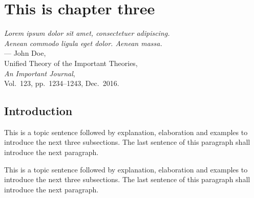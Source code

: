 

%
%
\chapter{This is chapter three}
\label{ch:name3}

\begin{flushright}
{\slshape Lorem ipsum dolor sit amet, consectetuer adipiscing.}\\
{\slshape Aenean commodo ligula eget dolor. Aenean massa.}\\
\medskip
--- John Doe,\\
Unified Theory of the Important Theories,\\
{\slshape An Important Journal},\\
Vol.~123, pp.~1234--1243, Dec.~2016.\\
\end{flushright}

\bigskip

\section{Introduction}
\label{sec:ch_3_introduction}

This is a topic sentence followed by explanation, elaboration and examples to introduce the next three subsections. The last sentence of this paragraph shall introduce the next paragraph. \lipsum[1]

This is a topic sentence followed by explanation, elaboration and examples to introduce the next three subsections. The last sentence of this paragraph shall introduce the next paragraph. \lipsum[1]

